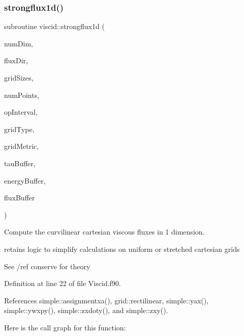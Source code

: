 \subsubsection{\texorpdfstring{strongflux1d()}{strongflux1d()}}
{\footnotesize\ttfamily subroutine viscid\+::strongflux1d (\begin{DoxyParamCaption}\item[{integer(kind=4), intent(in)}]{num\+Dim,  }\item[{integer(kind=4), intent(in)}]{flux\+Dir,  }\item[{integer(kind=8), dimension(numdim), intent(in)}]{grid\+Sizes,  }\item[{integer(kind=8), intent(in)}]{num\+Points,  }\item[{integer(kind=8), dimension(2$\ast$numdim), intent(in)}]{op\+Interval,  }\item[{integer(kind=4), intent(in)}]{grid\+Type,  }\item[{real(kind=8), dimension(numdim$\ast$numdim$\ast$numpoints), intent(in), target}]{grid\+Metric,  }\item[{real(kind=8), dimension(numpoints$\ast$numdim$\ast$(numdim+1)/2), intent(in), target}]{tau\+Buffer,  }\item[{real(kind=8), dimension(numpoints$\ast$numdim), intent(in), target}]{energy\+Buffer,  }\item[{real(kind=8), dimension(numpoints$\ast$(numdim+2)), intent(out), target}]{flux\+Buffer }\end{DoxyParamCaption})}



Compute the curvilinear cartesian viscous fluxes in 1 dimension. 

retains logic to simplify calculations on uniform or stretched cartesian grids

See /ref conserve for theory 

Definition at line 22 of file Viscid.\+f90.



References simple\+::assignmentxa(), grid\+::rectilinear, simple\+::yax(), simple\+::ywxpy(), simple\+::zxdoty(), and simple\+::zxy().

Here is the call graph for this function\+:
